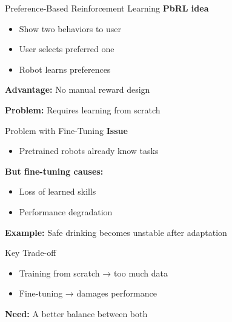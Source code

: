 \documentclass[aspectratio=169,10pt]{beamer}
\begin{document}
\begin{frame}{Preference-Based Reinforcement Learning}
\footnotesize
\textbf{PbRL idea}

\begin{itemize}\footnotesize
    \item Show two behaviors to user
    \item User selects preferred one
    \item Robot learns preferences
\end{itemize}

\vspace{0.5em}
\textbf{Advantage:} No manual reward design

\vspace{0.5em}
\textbf{Problem:} Requires learning from scratch
\end{frame}

\begin{frame}{Problem with Fine-Tuning}
\footnotesize
\textbf{Issue}

\begin{itemize}\footnotesize
    \item Pretrained robots already know tasks
\end{itemize}

\textbf{But fine-tuning causes:}
\begin{itemize}\footnotesize
    \item Loss of learned skills
    \item Performance degradation
\end{itemize}

\vspace{0.5em}
\textbf{Example:} Safe drinking becomes unstable after adaptation
\end{frame}

\begin{frame}{Key Trade-off}
\footnotesize
\begin{itemize}\footnotesize
    \item Training from scratch → too much data
    \item Fine-tuning → damages performance
\end{itemize}

\vspace{0.5em}
\textbf{Need:} A better balance between both
\end{frame}
\end{document}
